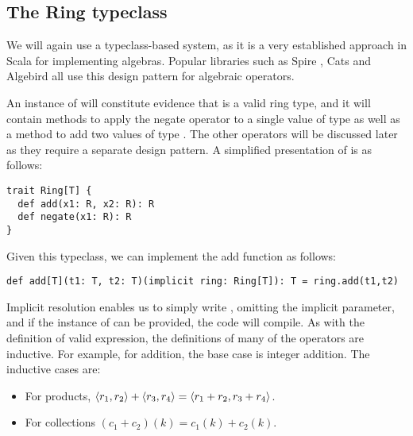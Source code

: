\subsection{The Ring typeclass}

We will again use a typeclass-based system, as it is a very established approach in Scala for implementing algebras. Popular libraries such as Spire \cite{spire}, Cats \cite{cats} and Algebird \cite{algebird} all use this design pattern for algebraic operators.

An instance of  will constitute evidence that  is a valid ring type, and it will contain methods to apply the negate operator to a single value of type  as well as a method to add two values of type . The other operators will be discussed later as they require a separate design pattern. A simplified presentation of  is as follows:
\vs
\begin{lstlisting}
trait Ring[T] {
  def add(x1: R, x2: R): R
  def negate(x1: R): R
}
\end{lstlisting}\vs
Given this typeclass, we can implement the add function as follows:
\vs\begin{lstlisting}
def add[T](t1: T, t2: T)(implicit ring: Ring[T]): T = ring.add(t1,t2)
\end{lstlisting}\vs
Implicit resolution enables us to simply write , omitting the implicit parameter, and if the instance of  can be provided, the code will compile. As with the definition of valid expression, the definitions of many of the operators are inductive. For example, for addition, the base case is integer addition. The inductive cases are:
\begin{itemize}
\item{For products, $\langle r_1, r_2 \rangle + \langle r_3, r_4 \rangle = \langle r_1 + r_2, r_3 + r_4 \rangle$.}
\item{For collections $(c_1 + c_2)(k) = c_1(k) + c_2(k)$.}
\end{itemize}

